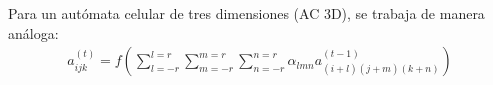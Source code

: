 Para un autómata celular de tres dimensiones (AC 3D), se trabaja de manera análoga:
\begin{equation}
    \label{eq:evolution_rule_3d}
    \begin{aligned}
        a_{ijk}^{(t)} = f(\sum^{l=r}_{l=-r}\sum^{m=r}_{m=-r}\sum^{n=r}_{n=-r}{\alpha_{lmn}a_{(i+l)(j+m)(k+n)}^{(t-1)}})
    \end{aligned}
\end{equation}